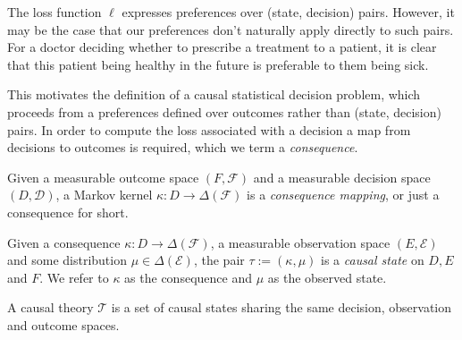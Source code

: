 The loss function $\ell$ expresses preferences over (state, decision) pairs. However, it may be the case that our preferences don't naturally apply directly to such pairs. For a doctor deciding whether to prescribe a treatment to a patient, it is clear that this patient being healthy in the future is preferable to them being sick.


This motivates the definition of a causal statistical decision problem, which proceeds from a preferences defined over outcomes rather than (state, decision) pairs. In order to compute the loss associated with a decision a map from decisions to outcomes is required, which we term a \emph{consequence}.

\begin{definition}[Consequences]
Given a measurable outcome space $(F,\mathcal{F})$ and a measurable decision space $(D,\mathcal{D})$, a Markov kernel $\kappa:D \to \Delta(\mathcal{F})$ is a \emph{consequence mapping}, or just a consequence for short.
\end{definition}

\begin{definition}
Given a consequence $\kappa:D\to \Delta(\mathcal{F})$, a measurable observation space $(E,\mathcal{E})$ and some distribution $\mu\in \Delta(\mathcal{E})$, the pair $\tau:=(\kappa,\mu)$ is a \emph{causal state} on $D, E$ and $F$. We refer to $\kappa$ as the consequence and $\mu$ as the observed state.
\end{definition}

\begin{definition}\label{def:causal_theory}
A causal theory $\mathscr{T}$ is a set of causal states sharing the same decision, observation and outcome spaces.
\end{definition}




